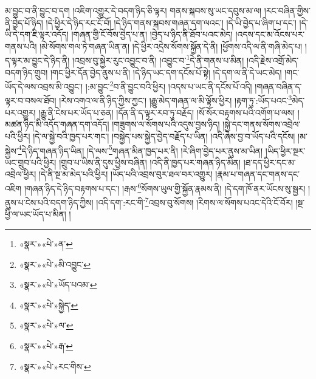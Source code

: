 མ་བྱུང་བ་ནི་བྱུང་བ་དག །འཇིག་འགྱུར་དེ་བདག་ཉིད་ཅི་ལྟར། གནས་སྐབས་སུ་ཡང་དབུས་མ་ལ། །རང་བཞིན་གྱིས་ནི་བྱེད་པོ་ཉིད། །དེ་ཕྱིར་དེ་ཉིད་རང་ངོ་བོ། །དེ་ཉིད་གནས་སྐབས་གཞན་དག་ལའང་། །དེ་ཡི་བྱེད་པ་ཞིག་པ་དང་། །དེ་ཡི་དེ་དག་ཇི་ལྟར་འདོད། །གཞན་གྱི་ངོ་བོས་བྱེད་པ་ན། །བྱེད་པ་ཉིད་ནི་ཐོབ་པའང་མེད། །འདས་དང་མ་འོངས་པར་གནས་པའི། །མེ་སོགས་གལ་ཏེ་གཞན་ཡིན་ན། །དེ་ཕྱིར་འདྲེས་སོགས་སྐྱོན་དེ་ནི། །ཕྱོགས་འདི་ལ་ནི་གཞི་མེད་པ། །ད་ལྟར་མ་བྱུང་དེ་ཉིད་ནི། །འབྲས་བུ་སྐྱེར་རུང་འབྱུང་བ་ནི། །འབྱུང་བ་\footnote{«སྣར་»«པེ་»ན་}དེ་ནི་གནས་པ་མིན། །འདི་རྗེས་འགྲོ་མེད་བདག་ཉིད་གྲུབ། །གང་ཕྱིར་དོན་བྱེད་ནུས་པ་ནི། །དེ་ཉིད་ཡང་དག་དངོས་པོ་སྟེ། །དེ་དག་ལ་ནི་དེ་ཡང་མེད། །གང་ཡོད་དེ་ལས་འབྲས་མི་འབྱུང་། །:མ་བྱུང་\footnote{«སྣར་»«པེ་»མི་འབྱུང་}བ་ནི་བྱུང་བའི་ཕྱིར། །འདས་པ་ཡང་ནི་དངོས་པོ་འདི། །གཞན་བཞིན་ད་ལྟར་བ་བསལ་ཐོབ། །རེས་འགའ་ལ་ནི་ཉིད་ཀྱིས་ཀྱང་། །རྒྱུ་མེད་གཞན་ལ་མི་ལྟོས་ཕྱིར། །རྟག་ཏུ་:ཡོད་པའང་\footnote{«སྣར་»«པེ་»ཡོད་པའམ་}མེད་པར་འགྱུར། །རྒྱུ་ནི་ངེས་པར་ཡོད་པ་ཅན། །དོན་ནི་ད་ལྟར་རབ་ཏུ་བརྗོད། །སོ་སོར་བརྟགས་པའི་འགོག་པ་ལས། །མཚན་ཉིད་མི་འདོད་གཞན་དག་འདོད། །གཟུགས་ལ་སོགས་པའི་འདུས་བྱས་ཉིད། །སྐྱེ་དང་གནས་སོགས་འབྲེལ་པའི་ཕྱིར། །དེ་ལ་སྐྱེ་བའི་ཁྱད་པར་གང་། །བསྐྱེད་པས་སྐྱེད་བྱེད་བརྗོད་པ་ཡིན། །འདི་ཞེས་བྱ་བ་ཡོད་པའི་དངོས། །མ་སྐྱེས་\footnote{«སྣར་»«པེ་»སྐྱེད་}དེ་ཉིད་གཞན་ཉིད་ཡིན། །དེ་ལས་\footnote{«སྣར་»«པེ་»ལ་}གཞན་མིན་ཁྱད་པར་ནི། །རེ་ཞིག་བྱེད་པར་ནུས་མ་ཡིན། །ཡིད་ཕྱིར་སྔར་ཡང་གྲུབ་པའི་ཕྱིར། །གྲུབ་པ་ཡིས་ནི་དུས་ཕྱིས་བཞིན། །འདི་ནི་ཁྱད་པར་གཞན་ཉིད་མིན། །ཐ་དད་ཕྱིར་དང་མ་འབྲེལ་ཕྱིར། །དེ་ནི་སྔ་མ་མེད་པའི་ཕྱིར། །ཡོད་པའི་འབྲས་བུར་ཐལ་བར་འགྱུར། །རྣམ་པ་གཞན་དང་གནས་དང་འཇིག །གཞན་ཉིད་དེ་ཉིད་བརྟགས་པ་དང་། །རྒས་\footnote{«སྣར་»«པེ་»རྒ་}སོགས་ཡུལ་གྱི་སྐྱོན་རྣམས་ནི། །དེ་དག་ཁོ་ནར་ཡོངས་སུ་སྦྱར། །ནུས་པ་ངེས་པའི་བདག་ཉིད་ཀྱིས། །འདི་དག་:རང་གི་\footnote{«སྣར་»«པེ་»རང་གིས་}འབྲས་བུ་སོགས། །རིགས་ལ་སོགས་པའང་དེའི་ངོ་བོར། །སྔ་ཕྱི་ལ་ཡང་ཡོད་པ་མིན། །
